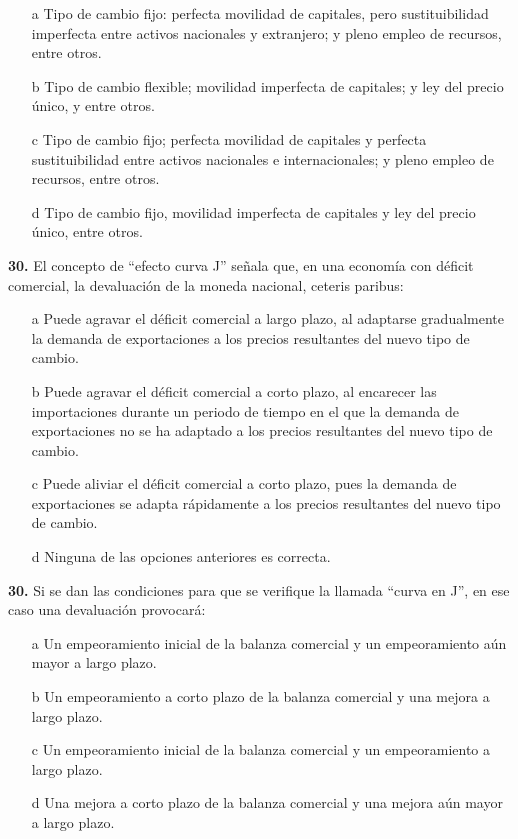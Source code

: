 \documentclass{nuevotema}
\begin{document}
\begin{itemize}
	\item[a] Tipo de cambio fijo: perfecta movilidad de capitales, pero sustituibilidad imperfecta entre activos nacionales y extranjero; y pleno empleo de recursos, entre otros.
	\item[b] Tipo de cambio flexible; movilidad imperfecta de capitales; y ley del precio único, y entre otros.
	\item[c] Tipo de cambio fijo; perfecta movilidad de capitales y perfecta sustituibilidad entre activos nacionales e internacionales; y pleno empleo de recursos, entre otros.
	\item[d] Tipo de cambio fijo, movilidad imperfecta de capitales y ley del precio único, entre otros.
\end{itemize}



\textbf{30.} El concepto de ``efecto curva J'' señala que, en una economía con déficit comercial, la devaluación de la moneda nacional, ceteris paribus:

\begin{itemize}
	\item[a] Puede agravar el déficit comercial a largo plazo, al adaptarse gradualmente la demanda de exportaciones a los precios resultantes del nuevo tipo de cambio.
	\item[b] Puede agravar el déficit comercial a corto plazo, al encarecer las importaciones durante un periodo de tiempo en el que la demanda de exportaciones no se ha adaptado a los precios resultantes del nuevo tipo de cambio.
	\item[c] Puede aliviar el déficit comercial a corto plazo, pues la demanda de exportaciones se adapta rápidamente a los precios resultantes del nuevo tipo de cambio.
	\item[d] Ninguna de las opciones anteriores es correcta.
\end{itemize}

\textbf{30.} Si se dan las condiciones para que se verifique la llamada ``curva en J'', en ese caso una devaluación provocará:

\begin{itemize}
	\item[a] Un empeoramiento inicial de la balanza comercial y un empeoramiento aún mayor a largo plazo.
	\item[b] Un empeoramiento a corto plazo de la balanza comercial y una mejora a largo plazo.
	\item[c] Un empeoramiento inicial de la balanza comercial y un empeoramiento a largo plazo.
	\item[d] Una mejora a corto plazo de la balanza comercial y una mejora aún mayor a largo plazo.
\end{itemize}
\end{document}
